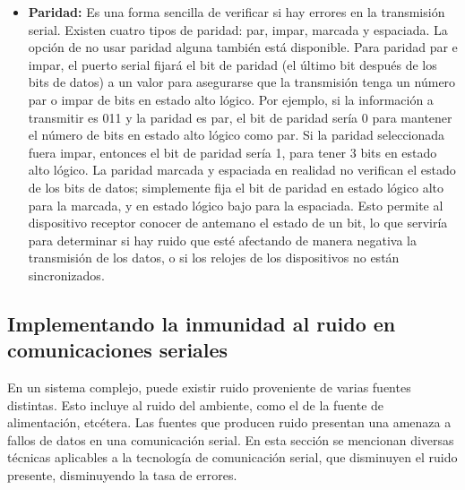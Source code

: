 \begin{itemize}
	\item \textbf{Paridad:} Es una forma sencilla de verificar si hay errores en la transmisión serial. Existen cuatro tipos de paridad: par, impar, marcada y espaciada. La opción de no usar paridad alguna también está disponible. Para paridad par e impar, el puerto serial fijará el bit de paridad (el último bit después de los bits de datos) a un valor para asegurarse que la transmisión tenga un número par o impar de bits en estado alto lógico. Por ejemplo, si la información a transmitir es 011 y la paridad es par, el bit de paridad sería 0 para mantener el número de bits en estado alto lógico como par. Si la paridad seleccionada fuera impar, entonces el bit de paridad sería 1, para tener 3 bits en estado alto lógico. La paridad marcada y espaciada en realidad no verifican el estado de los bits de datos; simplemente fija el bit de paridad en estado lógico alto para la marcada, y en estado lógico bajo para la espaciada. Esto permite al dispositivo receptor conocer de antemano el estado de un bit, lo que serviría para determinar si hay ruido que esté afectando de manera negativa la transmisión de los datos, o si los relojes de los dispositivos no están sincronizados.
\end{itemize}\cite{intro_serial}



\subsection{Implementando la inmunidad al ruido en comunicaciones seriales} %
\label{sub:implementando_la_inmunidad_al_ruido_en_comunicaciones_seriales}

En un sistema complejo, puede existir ruido proveniente de varias fuentes distintas. Esto incluye al ruido del ambiente, como el de la fuente de alimentación, etcétera. Las fuentes que producen ruido presentan una amenaza a fallos de datos en una comunicación serial. En esta sección se mencionan diversas técnicas aplicables a la tecnología de comunicación serial, que disminuyen el ruido presente, disminuyendo la tasa de errores.\cite{ruido_serial}

